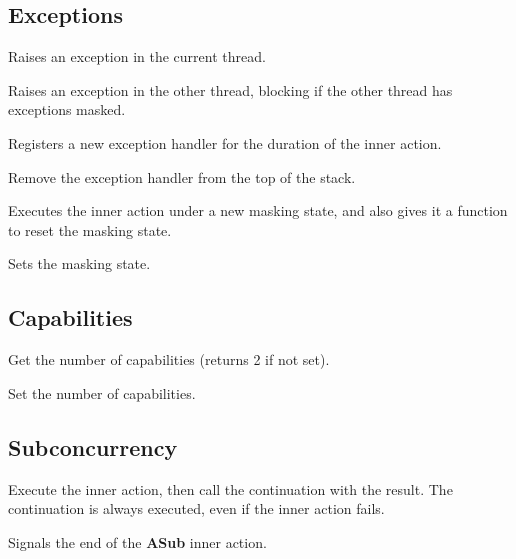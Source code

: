 \subsection{Exceptions}

\begin{description}
  Raises an exception in the current thread.

  Raises an exception in the other thread, blocking if the other thread has
  exceptions masked.

  Registers a new exception handler for the duration of the inner action.

  Remove the exception handler from the top of the stack.

  Executes the inner action under a new masking state, and also gives
  it a function to reset the masking state.

  Sets the masking state.
\end{description}

\subsection{Capabilities}

\begin{description}
  Get the number of capabilities (returns 2 if not set).

  Set the number of capabilities.
\end{description}

\subsection{Subconcurrency}

\begin{description}
  Execute the inner action, then call the continuation with the result.
  The continuation is always executed, even if the inner action fails.

  Signals the end of the \textbf{ASub} inner action.
\end{description}

